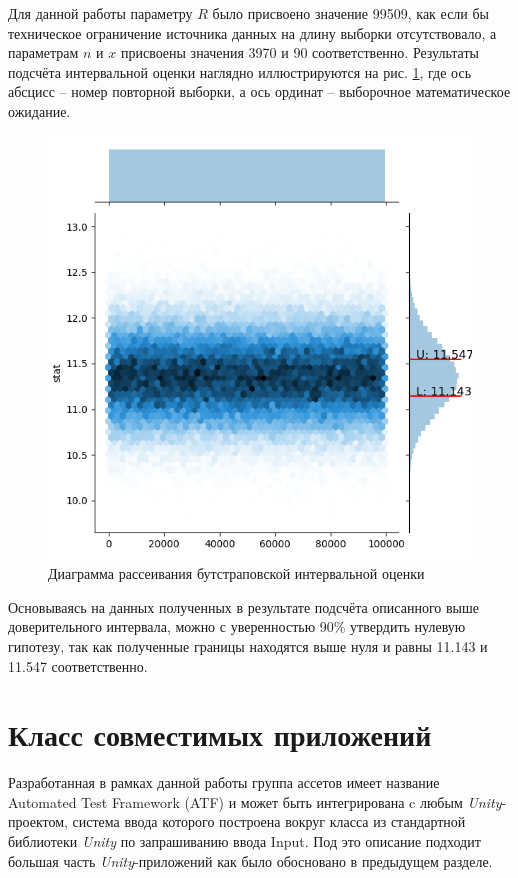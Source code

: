 Для данной работы параметру $R$ было присвоено значение 99509, как если бы техническое ограничение источника данных на длину выборки отсутствовало, а параметрам $n$ и $x$ присвоены значения 3970 и 90 соответственно. Результаты подсчёта интервальной оценки наглядно иллюстрируются на рис. \ref{experiment}, где ось абсцисс -- номер повторной выборки, а ось ординат -- выборочное математическое ожидание.

\begin{figure}[H]
	\centering
	\includegraphics[width=\linewidth]{experiment.png}
	\caption{Диаграмма рассеивания бутстраповской интервальной оценки}
	\label{experiment}
\end{figure}

Основываясь на данных полученных в результате подсчёта описанного выше доверительного интервала, можно с уверенностью 90\% утвердить нулевую гипотезу, так как полученные границы находятся выше нуля и равны 11.143 и 11.547 соответственно.

\section{Класс совместимых приложений}
Разработанная в рамках данной работы группа ассетов имеет название Automated Test Framework (ATF) и может быть интегрирована c любым  \textit{Unity}-проектом, система ввода которого построена вокруг класса из стандартной библиотеки \textit{Unity} по запрашиванию ввода Input. Под это описание подходит большая часть \textit{Unity}-приложений как было обосновано в предыдущем разделе.


